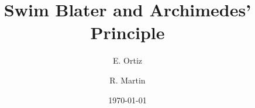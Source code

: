 \documentclass[showkeys,eqsecnum,twocolumn,aps,superscriptaddress]{revtex4-1}
\begin{document}
    \title{ Swim Blater and Archimedes' Principle} 
    \date{\today}
    \author{E. Ortiz}
    \author{R. Martin}


    

    \keywords{}

    \maketitle
    
    
    
    
    
    
    
    
    
    
    
    
    
    
\end{document}

